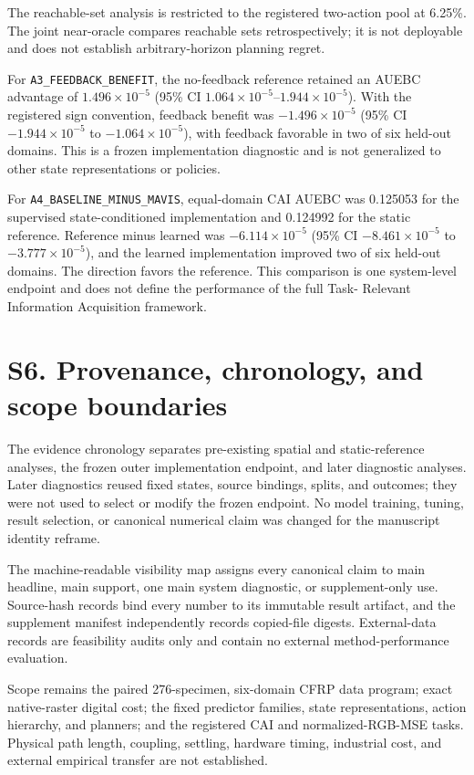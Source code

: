 \documentclass[11pt]{article}
\begin{document}
The reachable-set analysis is restricted to the registered two-action pool at
6.25\%. The joint near-oracle compares reachable sets retrospectively; it is
not deployable and does not establish arbitrary-horizon planning regret.

For \texttt{A3\_FEEDBACK\_BENEFIT}, the no-feedback reference retained an
AUEBC advantage of $1.496\times10^{-5}$ (95\% CI
$1.064\times10^{-5}$--$1.944\times10^{-5}$). With the registered sign
convention, feedback benefit was $-1.496\times10^{-5}$ (95\% CI
$-1.944\times10^{-5}$ to $-1.064\times10^{-5}$), with feedback favorable in
two of six held-out domains. This is a frozen implementation diagnostic and is
not generalized to other state representations or policies.

For \texttt{A4\_BASELINE\_MINUS\_MAVIS}, equal-domain CAI AUEBC was 0.125053
for the supervised state-conditioned implementation and 0.124992 for the
static reference. Reference minus learned was
$-6.114\times10^{-5}$ (95\% CI $-8.461\times10^{-5}$ to
$-3.777\times10^{-5}$), and the learned implementation improved two of six
held-out domains. The direction favors the reference. This comparison is one
system-level endpoint and does not define the performance of the full Task-
Relevant Information Acquisition framework.

\section{S6. Provenance, chronology, and scope boundaries}

The evidence chronology separates pre-existing spatial and static-reference
analyses, the frozen outer implementation endpoint, and later diagnostic
analyses. Later diagnostics reused fixed states, source bindings, splits, and
outcomes; they were not used to select or modify the frozen endpoint. No model
training, tuning, result selection, or canonical numerical claim was changed
for the manuscript identity reframe.

The machine-readable visibility map assigns every canonical claim to main
headline, main support, one main system diagnostic, or supplement-only use.
Source-hash records bind every number to its immutable result artifact, and the
supplement manifest independently records copied-file digests. External-data
records are feasibility audits only and contain no external method-performance
evaluation.

Scope remains the paired 276-specimen, six-domain CFRP data program; exact
native-raster digital cost; the fixed predictor families, state
representations, action hierarchy, and planners; and the registered CAI and
normalized-RGB-MSE tasks. Physical path length, coupling, settling, hardware
timing, industrial cost, and external empirical transfer are not established.
\end{document}
